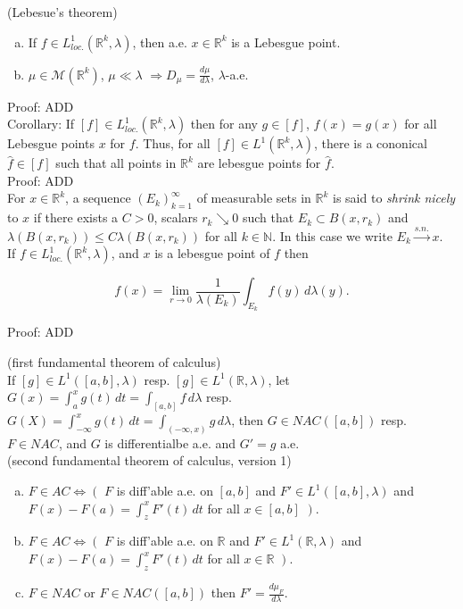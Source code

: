 \documentclass[12pt]{article}
\newcommand{\nats}[0] { \mathbb{N}}
\newcommand{\reals}[0] { \mathbb{R}}
\newcommand{\M}[0] { \mathcal{M} }
\newcommand{\rimply}[0] { \Rightarrow }
\newcommand{\lrimply}[0] { \Leftrightarrow }
\newcommand{\rarw}[0] { \rightarrow }
\begin{document}
(Lebesue's theorem)
\begin{enumerate}[a)]
\item
If $f \in L^1_{loc.}(\reals^k, \lambda)$, then a.e. $x \in \reals^k$ is a Lebesgue point.
\item 
$\mu \in \M(\reals^k)$, $\mu \ll \lambda$ $\rimply D_\mu = \frac{d\mu}{d\lambda}$, $\lambda$-a.e.
\end{enumerate}


\noindent
Proof: ADD \\

Corollary:
If $[f] \in L^1_{loc.}(\reals^k, \lambda)$ then for any $g \in [f]$, $f(x) = g(x)$ for all Lebesgue points $x$ for $f$. Thus, for all $[f] \in L^1(\reals^k, \lambda)$, there is a cononical $\hat{f} \in [f]$ such that all points in $\reals^k$ are lebesgue points for $\hat{f}$.     \\

\noindent
Proof: ADD \\




For $x \in \reals^k$, a sequence $(E_k)_{k=1}^\infty$ of measurable sets in $\reals^k$ is said to \emph{shrink nicely} to $x$ if there exists a $C>0$, scalars $r_k \searrow 0$ such that $E_k \subset B(x, r_k)$ and $ \lambda(B(x,r_k)) \le C \lambda(B(x, r_k))$ for all $k \in \nats$. In this case we write $E_k \overset{s.n.}{\rarw} x$. \\

If $f \in L^1_{loc.}(\reals^k, \lambda)$, and $x$ is a lebesgue point of $f$ then 

$$
f(x) = \lim_{r \rarw 0} \frac{1}{ \lambda(E_k)} \int_{E_k} f(y) \, d \lambda(y).
$$

\noindent
Proof: ADD \\


\break


(first fundamental theorem of calculus)  \\

\noindent
If $[g] \in L^1([a,b], \lambda )$ resp. $[g] \in L^1(\reals, \lambda)$, let $G(x) = \int_a^x g(t) \, dt = \int_{[a,b]} f \, d\lambda$ resp. $G(X) = \int_{-\infty}^x g(t) \, dt = \int_{(-\infty,x)} g \, d\lambda$, then $G \in NAC([a,b])$ resp. $F \in NAC$, and $G$ is differentialbe a.e. and $G' = g$ a.e. \\

(second fundamental theorem of calculus, version 1)
\begin{enumerate}[a)]
\item
$F \in AC \lrimply \left( \right.$  $F$ is diff'able a.e. on $[a,b]$ and $F' \in L^1([a,b], \lambda)$ and $F(x) - F(a) = \int_z^x F'(t)\, dt$ for all $x \in [a,b]$ $\left. \right)$.
\item
$F \in AC \lrimply \left( \right.$  $F$ is diff'able a.e. on $\reals$ and $F' \in L^1(\reals, \lambda)$ and $F(x) - F(a) = \int_z^x F'(t)\, dt$ for all $x \in \reals$ $\left. \right)$.
\item
$F \in NAC$ or $F \in NAC([a,b])$ then $F' = \frac{d\mu_F}{d\lambda}$.
\end{enumerate}
\end{document}

